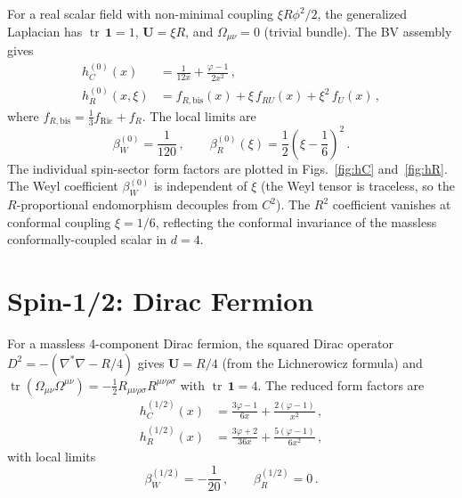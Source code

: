 \documentclass[aps,prd,twocolumn,superscriptaddress,nofootinbib,floatfix]{revtex4-2}
\newcommand{\Riemsq}{R_{\mu\nu\rho\sigma}R^{\mu\nu\rho\sigma}}
\newcommand{\tr}{\operatorname{tr}}
\begin{document}
For a real scalar field with non-minimal coupling $\xi R\phi^2/2$, the
generalized Laplacian has $\tr\,\mathbf{1} = 1$, $\mathbf{U} = \xi R$, and
$\Omega_{\mu\nu} = 0$ (trivial bundle). The BV assembly gives
\begin{subequations}
\label{eq:scalar-ff}
\begin{align}
  h_C^{(0)}(x) &= \frac{1}{12x} + \frac{\varphi - 1}{2x^2}\,,
  \label{eq:hC0}\\
  h_R^{(0)}(x,\xi) &= f_{R,\text{bis}}(x)
    + \xi\,f_{RU}(x) + \xi^2\,f_U(x)\,,
  \label{eq:hR0}
\end{align}
\end{subequations}
where $f_{R,\text{bis}} = \tfrac{1}{3}f_{\text{Ric}} + f_R$.
The local limits are
\begin{equation}
  \beta_W^{(0)} = \frac{1}{120}\,,\qquad
  \beta_R^{(0)}(\xi) = \frac{1}{2}\left(\xi - \frac{1}{6}\right)^{\!2}\,.
  \label{eq:beta-scalar}
\end{equation}
The individual spin-sector form factors are plotted in
Figs.~\ref{fig:hC} and~\ref{fig:hR}.
The Weyl coefficient $\beta_W^{(0)}$ is independent of $\xi$ (the Weyl tensor
is traceless, so the $R$-proportional endomorphism decouples from $C^2$). The
$R^2$ coefficient vanishes at conformal coupling $\xi = 1/6$, reflecting the
conformal invariance of the massless conformally-coupled scalar in $d = 4$.


\section{Spin-1/2: Dirac Fermion}
\label{sec:dirac}

For a massless 4-component Dirac fermion, the squared Dirac operator
$D^2 = -(\nabla^*\nabla - R/4)$ gives $\mathbf{U} = R/4$
(from the Lichnerowicz formula) and
$\tr(\Omega_{\mu\nu}\Omega^{\mu\nu}) = -\frac{1}{2}\Riemsq$ with
$\tr\,\mathbf{1} = 4$. The reduced form factors are
\begin{subequations}
\label{eq:dirac-ff}
\begin{align}
  h_C^{(1/2)}(x) &= \frac{3\varphi - 1}{6x}
    + \frac{2(\varphi - 1)}{x^2}\,,
  \label{eq:hC12}\\
  h_R^{(1/2)}(x) &= \frac{3\varphi + 2}{36x}
    + \frac{5(\varphi - 1)}{6x^2}\,,
  \label{eq:hR12}
\end{align}
\end{subequations}
with local limits
\begin{equation}
  \beta_W^{(1/2)} = -\frac{1}{20}\,,\qquad
  \beta_R^{(1/2)} = 0\,.
  \label{eq:beta-dirac}
\end{equation}
\end{document}
